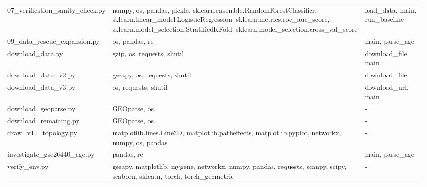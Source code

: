 \documentclass[11pt]{article}
\begin{document}
\begin{longtable}{p{}p{}p{}}
07\_verification\_sanity\_check.py & numpy, os, pandas, pickle, sklearn.ensemble.RandomForestClassifier, sklearn.linear\_model.LogisticRegression, sklearn.metrics.roc\_auc\_score, sklearn.model\_selection.StratifiedKFold, sklearn.model\_selection.cross\_val\_score & load\_data, main, run\_baseline \\
09\_data\_rescue\_expansion.py & os, pandas, re & main, parse\_age \\
download\_data.py & gzip, os, requests, shutil & download\_file, main \\
download\_data\_v2.py & gseapy, os, requests, shutil & download\_file \\
download\_data\_v3.py & os, requests, shutil & download\_url, main \\
download\_geoparse.py & GEOparse, os & - \\
download\_remaining.py & GEOparse, os & - \\
draw\_v11\_topology.py & matplotlib.lines.Line2D, matplotlib.patheffects, matplotlib.pyplot, networkx, numpy, os, pandas & - \\
investigate\_gse26440\_age.py & pandas, re & main, parse\_age \\
verify\_env.py & gseapy, matplotlib, mygene, networkx, numpy, pandas, requests, scanpy, scipy, seaborn, sklearn, torch, torch\_geometric & - \\
\end{longtable}
\end{document}

